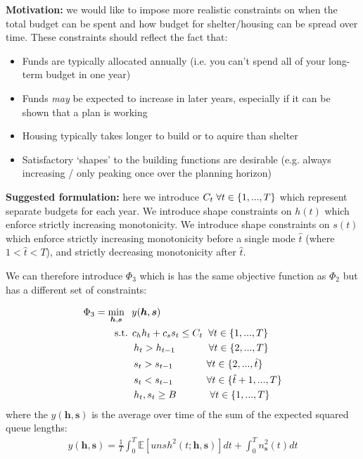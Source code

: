 \documentclass{article}
\begin{document}
\textbf{Motivation:} we would like to impose more realistic constraints on when the total budget can be spent and how budget for shelter/housing can be spread over time. These constraints should reflect the fact that:
%
\begin{itemize}[noitemsep]
\item Funds are typically allocated annually (i.e. you can't spend all of your long-term budget in one year)
\item Funds \emph{may} be expected to increase in later years, especially if it can be shown that a plan is working
\item Housing typically takes longer to build or to aquire than shelter
  \item Satisfactory `shapes' to the building functions are desirable (e.g. always increasing / only peaking once over the planning horizon)
\end{itemize}
%
\textbf{Suggested formulation:} here we introduce $C_t \hspace{0.1cm} \forall t \in \{1, ..., T\}$ which represent separate budgets for each year. We introduce shape constraints on $h(t)$ which enforce strictly increasing monotonicity. We introduce shape constraints on $s(t)$ which enforce strictly increasing monotonicity before a single mode $\hat{t}$ (where $1 < \hat{t} < T$), and strictly decreasing monotonicity after $\hat{t}$. \par
%
We can therefore introduce $\Phi_3$ which is has the same objective function as $\Phi_2$ but has a different set of constraints: 

\begin{align*}
        & \Phi_3 = \min_{\boldsymbol{h},\boldsymbol{s}} \hspace{0.2cm} y(\boldsymbol{h},\boldsymbol{s}) \\
        & \hspace{1cm} \text{ s.t. } c_{h}h_{t} + c_{s}s_{t} \leq C_t \hspace{0.2cm} \forall t \in \{1, ..., T\} \\
        & \hspace{1.8cm} h_t > h_{t-1} \hspace{1.2cm} \forall t \in \{2, ..., T\} \\
        & \hspace{1.8cm} s_t > s_{t-1} \hspace{1.2cm} \forall t \in \{2, ..., \hat{t}\} \\
        & \hspace{1.8cm} s_t < s_{t-1} \hspace{1.2cm} \forall t \in \{\hat{t}+1, ..., T\} \\
        & \hspace{1.8cm} h_t, s_t \geq B \hspace{1.2cm} \forall t \in \{1, ..., T\}
\end{align*}
%
where the $y(\boldsymbol{h},\boldsymbol{s})$ is the average over time of the sum of the expected squared queue lengths: 
\begin{align*}
  y(\boldsymbol{h},\boldsymbol{s}) = \frac{1}{T} \int_0^T \mathbb{E}[unsh^2(t; \boldsymbol{h},\boldsymbol{s})] dt + \int_0^T n_{\boldsymbol{s}}^2(t) dt
\end{align*}
\end{document}
